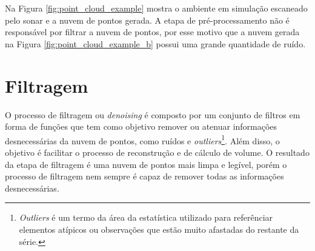 Na Figura \ref{fig:point_cloud_example} mostra o ambiente em simulação escaneado pelo sonar e a nuvem de pontos gerada.
A etapa de pré-processamento não é responsável por filtrar a nuvem de pontos, por esse motivo que a nuvem gerada na Figura \ref{fig:point_cloud_example_b} possui uma grande quantidade de ruído.


\section{Filtragem}
\label{sec:filtragem}

O processo de filtragem ou \textit{denoising} é composto por um conjunto de filtros em forma de funções que tem como objetivo remover ou atenuar informações desnecessárias da nuvem de pontos, como ruídos e \textit{outliers}\footnote{\textit{Outliers} é um termo da área da estatística utilizado para referênciar elementos atípicos ou observações que estão muito afastadas do restante da série.}.
Além disso, o objetivo é facilitar o processo de reconstrução e de cálculo de volume.
O resultado da etapa de filtragem é uma nuvem de pontos mais limpa e legível, porém o processo de filtragem nem sempre é capaz de remover todas as informações desnecessárias.

